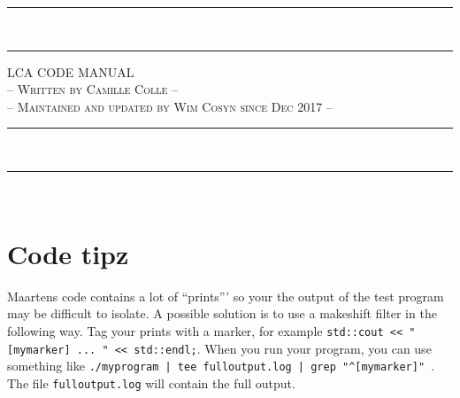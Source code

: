 \documentclass[10pt]{article}
\begin{document}
\rule{\textwidth}{2pt} \\ [-0.8\baselineskip]
\rule{\textwidth}{1pt}
\begin{center}
{\Huge \textsc{LCA CODE MANUAL}} \\
\vspace{10pt}
\textsc{ -- Written by Camille Colle -- }\\
\textsc{ -- Maintained and updated by Wim Cosyn since Dec 2017 -- }

\end{center}
\rule{\textwidth}{1pt} \\ [-0.75\baselineskip]
\rule{\textwidth}{2pt} \\ [2\baselineskip]

\tableofcontents

\section{Code tipz}
Maartens code contains a lot of ``prints''' so your the output of the test program may be difficult to isolate.
A possible solution is to use a makeshift filter in the following way. Tag your prints with a marker, for example \texttt{std::cout << "[mymarker] ... " << std::endl;}. When you run your program, you can use something like \texttt{./myprogram | tee fulloutput.log | grep "\textasciicircum[mymarker]" }.
The file \texttt{fulloutput.log} will contain the full output.
\end{document}
